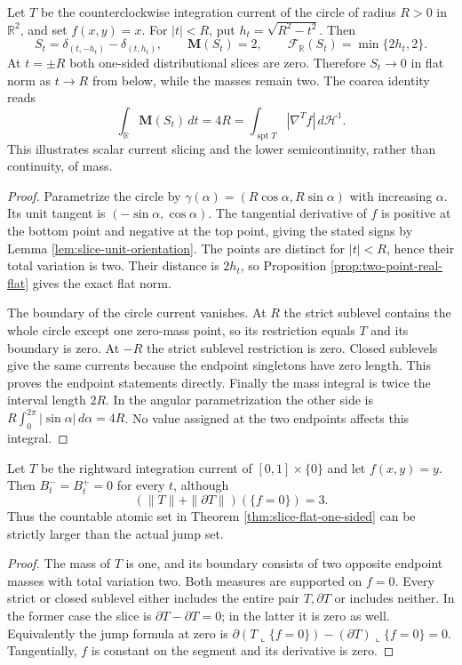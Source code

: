 \begin{example}\label{ex:circle-slice-mass-loss}
Let $T$ be the counterclockwise integration current of the circle of radius $R>0$ in $\mathbb R^2$, and set $f(x,y)=x$. For $|t|<R$, put $h_t=\sqrt{R^2-t^2}$. Then
\[
 S_t=\delta_{(t,-h_t)}-\delta_{(t,h_t)},\qquad
 \mathbf M(S_t)=2,\qquad
 \mathcal F_{\mathbb R}(S_t)=\min\{2h_t,2\}.
\]
At $t=\pm R$ both one-sided distributional slices are zero. Therefore $S_t\to0$ in flat norm as $t\to R$ from below, while the masses remain two. The coarea identity reads
\[
 \int_{\mathbb R}\mathbf M(S_t)\,dt=4R
 =\int_{\operatorname{spt}T}|\nabla^Tf|\,d\mathcal H^1.
\]
This illustrates scalar current slicing and the lower semicontinuity, rather than continuity, of mass.
\end{example}
\begin{proof}
Parametrize the circle by $\gamma(\alpha)=(R\cos\alpha,R\sin\alpha)$ with increasing $\alpha$. Its unit tangent is $(-\sin\alpha,\cos\alpha)$. The tangential derivative of $f$ is positive at the bottom point and negative at the top point, giving the stated signs by Lemma \ref{lem:slice-unit-orientation}. The points are distinct for $|t|<R$, hence their total variation is two. Their distance is $2h_t$, so Proposition \ref{prop:two-point-real-flat} gives the exact flat norm.

The boundary of the circle current vanishes. At $R$ the strict sublevel contains the whole circle except one zero-mass point, so its restriction equals $T$ and its boundary is zero. At $-R$ the strict sublevel restriction is zero. Closed sublevels give the same currents because the endpoint singletons have zero length. This proves the endpoint statements directly. Finally the mass integral is twice the interval length $2R$. In the angular parametrization the other side is $R\int_0^{2\pi}|\sin\alpha|\,d\alpha=4R$. No value assigned at the two endpoints affects this integral.
\end{proof}

\begin{example}\label{ex:level-atom-no-jump}
Let $T$ be the rightward integration current of $[0,1]\times\{0\}$ and let $f(x,y)=y$. Then $B_t^-=B_t^+=0$ for every $t$, although
\[
 (\|T\|+\|\partial T\|)(\{f=0\})=3.
\]
Thus the countable atomic set in Theorem \ref{thm:slice-flat-one-sided} can be strictly larger than the actual jump set.
\end{example}
\begin{proof}
The mass of $T$ is one, and its boundary consists of two opposite endpoint masses with total variation two. Both measures are supported on $f=0$. Every strict or closed sublevel either includes the entire pair $T,\partial T$ or includes neither. In the former case the slice is $\partial T-\partial T=0$; in the latter it is zero as well. Equivalently the jump formula at zero is $\partial(T\llcorner\{f=0\})-(\partial T)\llcorner\{f=0\}=0$. Tangentially, $f$ is constant on the segment and its derivative is zero.
\end{proof}


